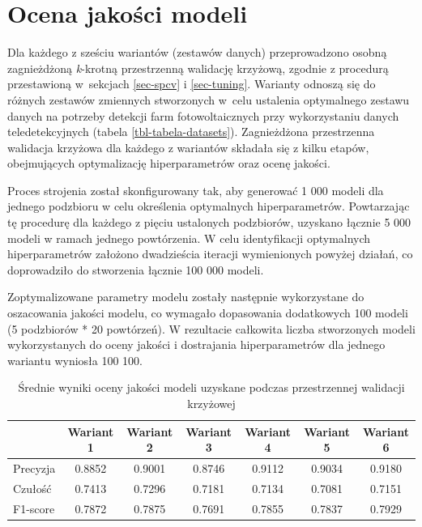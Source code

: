 \documentclass{amuthesis}
\begin{document}
\hypertarget{sec-results-model-quality-assessment}{%
\section{Ocena jakości
modeli}\label{sec-results-model-quality-assessment}}

Dla każdego z sześciu wariantów (zestawów danych) przeprowadzono osobną
zagnieżdżoną \emph{k}-krotną przestrzenną walidację krzyżową, zgodnie z
procedurą przestawioną w~sekcjach \ref{sec-spcv} i \ref{sec-tuning}.
Warianty odnoszą się do różnych zestawów zmiennych stworzonych w~celu
ustalenia optymalnego zestawu danych na potrzeby detekcji farm
fotowoltaicznych przy wykorzystaniu danych teledetekcyjnych (tabela
\ref{tbl-tabela-datasets}). Zagnieżdżona przestrzenna walidacja krzyżowa
dla każdego z wariantów składała się z kilku etapów, obejmujących
optymalizację hiperparametrów oraz ocenę jakości.

Proces strojenia został skonfigurowany tak, aby generować 1 000 modeli
dla jednego podzbioru w celu określenia optymalnych hiperparametrów.
Powtarzając tę procedurę dla każdego z pięciu ustalonych podzbiorów,
uzyskano łącznie 5 000 modeli w ramach jednego powtórzenia. W celu
identyfikacji optymalnych hiperparametrów założono dwadzieścia iteracji
wymienionych powyżej działań, co doprowadziło do stworzenia łącznie 100
000 modeli.

Zoptymalizowane parametry modelu zostały następnie wykorzystane do
oszacowania jakości modelu, co wymagało dopasowania dodatkowych 100
modeli (5 podzbiorów * 20 powtórzeń). W rezultacie całkowita liczba
stworzonych modeli wykorzystanych do oceny jakości i dostrajania
hiperparametrów dla jednego wariantu wyniosła 100 100.

\hypertarget{tbl-tabela-performance-measures}{}
\begin{table}
\caption{\label{tbl-tabela-performance-measures}Średnie wyniki oceny jakości modeli uzyskane podczas przestrzennej
walidacji krzyżowej }\tabularnewline

\centering
\begin{tabular}{lcccccc}
\toprule
  & Wariant 1 & Wariant 2 & Wariant 3 & Wariant 4 & Wariant 5 & Wariant 6\\
\midrule
Precyzja & 0.8852 & 0.9001 & 0.8746 & 0.9112 & 0.9034 & 0.9180\\
Czułość & 0.7413 & 0.7296 & 0.7181 & 0.7134 & 0.7081 & 0.7151\\
F1-score & 0.7872 & 0.7875 & 0.7691 & 0.7855 & 0.7837 & 0.7929\\
\bottomrule
\end{tabular}
\end{table}
\end{document}
